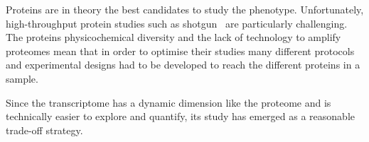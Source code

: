 Proteins are in theory the best candidates to study the phenotype.
Unfortunately, high-throughput protein studies
such as shotgun \ms\ are particularly challenging.
The proteins physicochemical diversity and
the lack of technology to amplify proteomes mean that
in order to optimise their studies many different protocols and experimental designs
had to be developed to reach the different proteins in a sample.

Since the transcriptome has a dynamic dimension like the proteome
and is technically easier to explore and quantify,
its study has emerged as a reasonable trade-off strategy.

